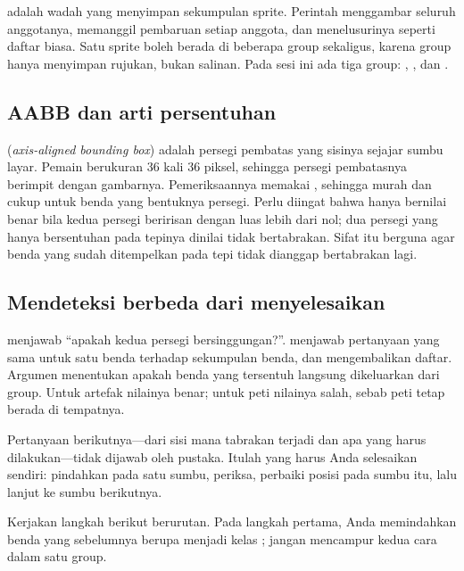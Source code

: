  adalah wadah yang menyimpan sekumpulan sprite. Perintah
 menggambar seluruh anggotanya,
 memanggil pembaruan setiap anggota, dan
 menelusurinya seperti daftar biasa. Satu sprite
boleh berada di beberapa group sekaligus, karena group hanya menyimpan
rujukan, bukan salinan. Pada sesi ini ada tiga group: ,
, dan .

\subsection*{AABB dan arti persentuhan}

 (\emph{axis-aligned bounding box}) adalah persegi pembatas yang
sisinya sejajar sumbu layar. Pemain berukuran 36 kali 36 piksel, sehingga
persegi pembatasnya berimpit dengan gambarnya. Pemeriksaannya memakai
, sehingga murah dan cukup untuk benda yang bentuknya persegi.
Perlu diingat bahwa
 hanya bernilai benar bila kedua persegi beririsan dengan
luas lebih dari nol; dua persegi yang hanya bersentuhan pada tepinya dinilai
tidak bertabrakan. Sifat itu berguna agar benda yang sudah ditempelkan pada
tepi tidak dianggap bertabrakan lagi.

\subsection*{Mendeteksi berbeda dari menyelesaikan}

 menjawab ``apakah kedua persegi bersinggungan?''.
 menjawab pertanyaan yang sama untuk
satu benda terhadap sekumpulan benda, dan mengembalikan daftar. Argumen
 menentukan apakah benda yang tersentuh langsung dikeluarkan dari
group. Untuk artefak nilainya benar; untuk peti nilainya salah, sebab peti
tetap berada di tempatnya.

Pertanyaan berikutnya---dari sisi mana tabrakan terjadi dan apa yang harus
dilakukan---tidak dijawab oleh pustaka. Itulah  yang harus
Anda selesaikan sendiri: pindahkan pada satu sumbu, periksa, perbaiki posisi
pada sumbu itu, lalu lanjut ke sumbu berikutnya.


Kerjakan langkah berikut berurutan. Pada langkah pertama, Anda memindahkan
benda yang sebelumnya berupa  menjadi kelas ; jangan
mencampur kedua cara dalam satu group.

